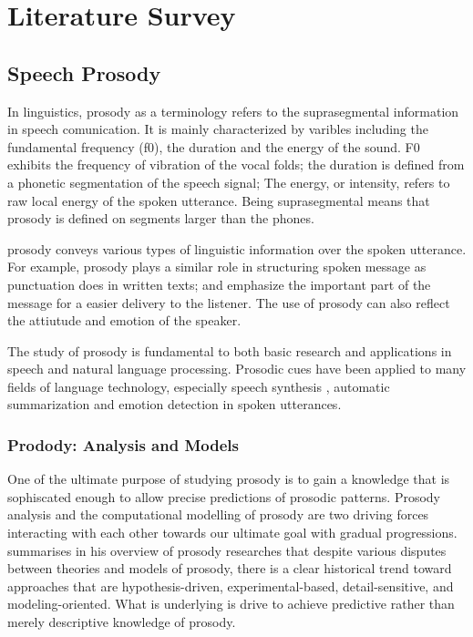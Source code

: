 \chapter{Literature Survey}

\section{Speech Prosody}
In linguistics, prosody as a terminology refers to the suprasegmental information in speech comunication. It is mainly characterized by varibles including the fundamental frequency (f0), the duration and the energy of the sound. F0 exhibits the frequency of vibration of the vocal folds; the duration is defined from a phonetic segmentation of the speech signal; The energy, or intensity, refers to raw local energy of the spoken utterance. Being suprasegmental means that prosody is defined on segments larger than the phones.

prosody conveys various types of linguistic information over the spoken utterance. For example, prosody plays a similar role in structuring spoken message as punctuation does in written texts; and emphasize the important part of the message for a easier delivery to the listener. The use of prosody can also reflect the attiutude and emotion of the speaker. \citep{Jurafsky2008, Hirschberg2017, Jouvet2019}

The study of prosody is fundamental to both basic research and applications in speech and natural language processing. Prosodic cues have been applied to many fields of language technology, especially speech synthesis  \citep{Schuller2018}, automatic summarization \citep{Chen2010} and emotion detection \citep{Liu2016} in spoken utterances. 

\subsection{Prodody: Analysis and Models}
One of the ultimate purpose of studying prosody is to gain a knowledge that is sophiscated enough to allow precise predictions of prosodic patterns. Prosody analysis and the computational modelling of prosody are two driving forces interacting with each other towards our ultimate goal with gradual progressions. \citet{Xu2015} summarises in his overview of prosody researches that despite various disputes between theories and models of prosody, there is a clear historical trend toward approaches that are hypothesis-driven, experimental-based, detail-sensitive, and modeling-oriented. What is underlying is drive to achieve predictive rather than merely descriptive knowledge of prosody. 

